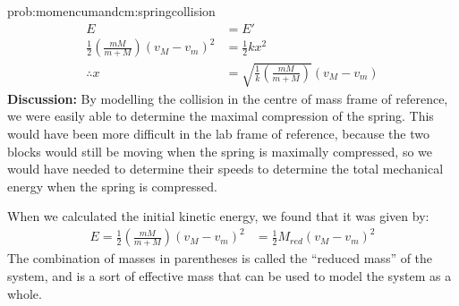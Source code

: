 \begin{solution}{prob:momencumandcm:springcollision}
\begin{align*}
E &= E' \\
\frac{1}{2} \left(\frac{mM}{m+M}\right)(v_M-v_m)^2 &= \frac{1}{2}kx^2\\
\therefore x &= \sqrt{\frac{1}{k} \left(\frac{mM}{m+M}\right)}(v_M-v_m)
\end{align*}
\textbf{Discussion:} By modelling the collision in the centre of mass frame of reference, we were easily able to determine the maximal compression of the spring. This would have been more difficult in the lab frame of reference, because the two blocks would still be moving when the spring is maximally compressed, so we would have needed to determine their speeds to determine the total mechanical energy when the spring is compressed.

When we calculated the initial kinetic energy, we found that it was given by:
\begin{align*}
E=\frac{1}{2} \left(\frac{mM}{m+M}\right)(v_M-v_m)^2 &=\frac{1}{2}M_{red}(v_M-v_m)^2
\end{align*}
The combination of masses in parentheses is called the ``reduced mass'' of the system, and is a sort of effective mass that can be used to model the system as a whole. 
\end{solution}


